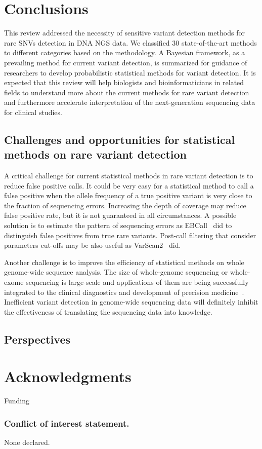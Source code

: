 \documentclass[a4,center,fleqn]{NAR}
\begin{document}
\section{Conclusions}

This review addressed the necessity of sensitive variant detection methods for rare SNVs detection in DNA NGS data.
We classified 30 state-of-the-art methods to different categories based on the methodology.
A Bayesian framework, as a prevailing method for current variant detection, is summarized for guidance of researchers to develop probabilistic statistical methods for variant detection.
It is expected that this review will help biologists and bioinformaticians in related fields to understand more about the current methods for rare variant detection and furthermore accelerate interpretation of the next-generation sequencing data for clinical studies. 


\subsection{Challenges and opportunities for statistical methods on rare variant detection}

A critical challenge for current statistical methods in rare variant detection is to reduce false positive calls.
It could be very easy for a statistical method to call a false positive when the allele frequency of a true positive variant is very close to the fraction of sequencing errors.
Increasing the depth of coverage may reduce false positive rate, but it is not guaranteed in all circumstances.
A possible solution is to estimate the pattern of sequencing errors as EBCall~\citep{Shiraishi2013} did to distinguish false positives from true rare variants.
Post-call filtering that consider parameters cut-offs may be also useful as VarScan2~\citep{Koboldt2012} did.

Another challenge is to improve the efficiency of statistical methods on whole genome-wide sequence analysis.
The size of whole-genome sequencing or whole-exome sequencing is large-scale and applications of them are being successfully integrated to the clinical diagnostics and development of precision medicine~\citep{chiang2012exome, worthey2011making}.
Inefficient variant detection in genome-wide sequencing data will definitely inhibit the effectiveness of translating the sequencing data into knowledge.



\subsection{Perspectives}




\section{Acknowledgments}
Funding




\subsubsection{Conflict of interest statement.} None declared.
\newpage



\end{document}
